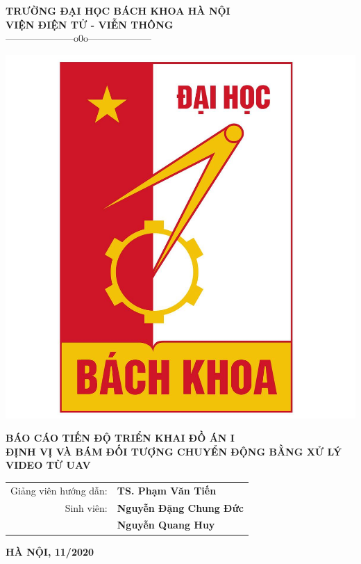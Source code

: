 \documentclass[12pt,a4paper]{report}
\begin{document}
 

\fontsize{13pt}{18pt}\selectfont   %

\setlength{\baselineskip}{18truept}
\begin{titlepage}                                                       %
\begin{center}
{\large\bf TRƯỜNG ĐẠI HỌC BÁCH KHOA HÀ NỘI}\\
{\large\bf VIỆN ĐIỆN TỬ - VIỄN THÔNG} \\
{---------------------o0o--------------------}
\vskip 2cm

\begin{center}
	\includegraphics[scale=.2]{logo_hust.jpg}	
\end{center}

{\bf BÁO CÁO TIẾN ĐỘ TRIỂN KHAI ĐỒ ÁN I}\\[1cm]
{\Large\bf \textbf{ĐỊNH VỊ VÀ BÁM ĐỐI TƯỢNG CHUYỂN ĐỘNG BẰNG XỬ LÝ VIDEO TỪ UAV}}\\
\vskip 1cm
\vskip 1cm

\begin{tabular}{r l}
Giảng viên hướng dẫn:&{\bf TS. Phạm Văn Tiến}\\[0.5cm]
Sinh viên:&{\bf Nguyễn Đặng Chung Đức} \\ &{\bf Nguyễn Quang Huy}\\[0.5cm]
\end{tabular}
\vfill
{\bf HÀ NỘI, 11/2020}
\end{center}
\end{titlepage}
\end{document}
